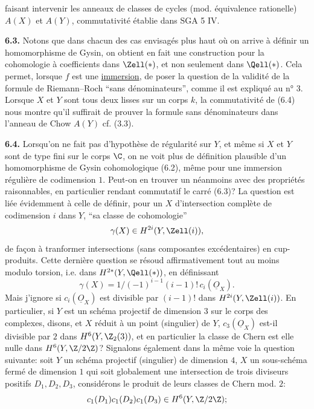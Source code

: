 
faisant intervenir les anneaux de classes de cycles (mod. équivalence rationelle) $A(X)$ et $A(Y)$, commutativité établie dans SGA 5 IV.

\textbf{6.3.} Notons que dans chacun des cas envisagés plus haut où on arrive à définir un homomorphisme de Gysin, on obtient en fait une construction pour la cohomologie à coefficients dans $\Zell(*)$, et non seulement dans $\Qell(*)$. Cela permet, lorsque $f$ est une \uline{immersion}, de poser la question de la validité de la formule de Riemann--Roch ``sans dénominateurs'', comme il est expliqué au n° 3. Lorsque $X$ et $Y$ sont tous deux lisses sur un corps $k$, la commutativité de (6.4) nous montre qu'il suffirait de prouver la formule sans dénominateurs dans l'anneau de Chow $A(Y)$ cf. (3.3).

\textbf{6.4.} Lorsqu'on ne fait pas d'hypothèse de régularité sur $Y$, et même si $X$ et $Y$ sont de type fini sur le corps $\C$, on ne voit plus de définition plausible d'un homomorphisme de Gysin cohomologique (6.2), même pour une immersion régulière de codimension $1$. Peut-on en trouver un néanmoins avec des propriétés raisonnables, en particulier rendant commutatif le carré (6.3)? La question est liée évidemment à celle de définir, pour un $X$ d'intersection complète de codimension $i$ dans $Y$, ``sa classe de cohomologie''
\[
 \gamma(X)\in H^{2i}(Y,\Zell(i)),
\]
de façon à tranformer intersections (sans composantes excédentaires) en cup-produits. Cette dernière question se résoud affirmativement tout au moins modulo torsion, i.e. dans $H^{2*}(Y,\Qell(*))$, en définissant
\[
 \gamma(X)=1/(-1)^{i-1}(i-1)!\,c_i(\underline{O}_X).
\]
Mais j'ignore si $c_i(\underline{O}_X)$ est divisible par $(i-1)!$ dans $H^{2i}(Y,\Zell(i))$. En particulier, si $Y$ est un schéma projectif de dimension $3$ sur le corps des complexes, disons, et $X$ réduit à un point (singulier) de $Y$, $c_3(\underline{O}_X)$ est-il divisible par $2$ dans $H^6(Y,\Z_2(3))$, et en particulier la classe de Chern est elle nulle dans $H^6(Y,\Z/2\Z)$? Signalons également dans la même voie la question suivante: soit $Y$ un schéma projectif (singulier) de dimension $4$, $X$ un sous-schéma fermé de dimension $1$ qui soit globalement une intersection de trois diviseurs positifs $D_1,D_2,D_3$, considérons le produit de leurs classes de Chern mod. $2$:
\[
 c_1(D_1)c_1(D_2)c_1(D_3)\in H^6(Y,\Z/2\Z);
\]
